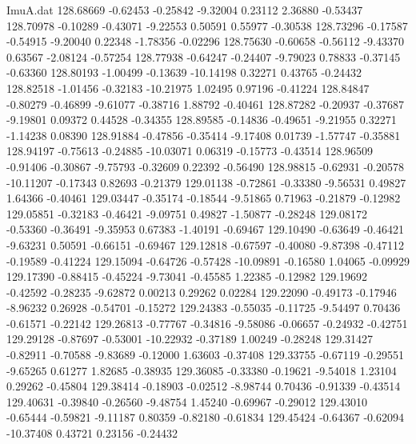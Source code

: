\begin{filecontents}{ImuA.dat}
 128.68669   -0.62453   -0.25842   -9.32004    0.23112    2.36880   -0.53437
 128.70978   -0.10289   -0.43071   -9.22553    0.50591    0.55977   -0.30538
 128.73296   -0.17587   -0.54915   -9.20040    0.22348   -1.78356   -0.02296
 128.75630   -0.60658   -0.56112   -9.43370    0.63567   -2.08124   -0.57254
 128.77938   -0.64247   -0.24407   -9.79023    0.78833   -0.37145   -0.63360
 128.80193   -1.00499   -0.13639  -10.14198    0.32271    0.43765   -0.24432
 128.82518   -1.01456   -0.32183  -10.21975    1.02495    0.97196   -0.41224
 128.84847   -0.80279   -0.46899   -9.61077   -0.38716    1.88792   -0.40461
 128.87282   -0.20937   -0.37687   -9.19801    0.09372    0.44528   -0.34355
 128.89585   -0.14836   -0.49651   -9.21955    0.32271   -1.14238    0.08390
 128.91884   -0.47856   -0.35414   -9.17408    0.01739   -1.57747   -0.35881
 128.94197   -0.75613   -0.24885  -10.03071    0.06319   -0.15773   -0.43514
 128.96509   -0.91406   -0.30867   -9.75793   -0.32609    0.22392   -0.56490
 128.98815   -0.62931   -0.20578  -10.11207   -0.17343    0.82693   -0.21379
 129.01138   -0.72861   -0.33380   -9.56531    0.49827    1.64366   -0.40461
 129.03447   -0.35174   -0.18544   -9.51865    0.71963   -0.21879   -0.12982
 129.05851   -0.32183   -0.46421   -9.09751    0.49827   -1.50877   -0.28248
 129.08172   -0.53360   -0.36491   -9.35953    0.67383   -1.40191   -0.69467
 129.10490   -0.63649   -0.46421   -9.63231    0.50591   -0.66151   -0.69467
 129.12818   -0.67597   -0.40080   -9.87398   -0.47112   -0.19589   -0.41224
 129.15094   -0.64726   -0.57428  -10.09891   -0.16580    1.04065   -0.09929
 129.17390   -0.88415   -0.45224   -9.73041   -0.45585    1.22385   -0.12982
 129.19692   -0.42592   -0.28235   -9.62872    0.00213    0.29262    0.02284
 129.22090   -0.49173   -0.17946   -8.96232    0.26928   -0.54701   -0.15272
 129.24383   -0.55035   -0.11725   -9.54497    0.70436   -0.61571   -0.22142
 129.26813   -0.77767   -0.34816   -9.58086   -0.06657   -0.24932   -0.42751
 129.29128   -0.87697   -0.53001  -10.22932   -0.37189    1.00249   -0.28248
 129.31427   -0.82911   -0.70588   -9.83689   -0.12000    1.63603   -0.37408
 129.33755   -0.67119   -0.29551   -9.65265    0.61277    1.82685   -0.38935
 129.36085   -0.33380   -0.19621   -9.54018    1.23104    0.29262   -0.45804
 129.38414   -0.18903   -0.02512   -8.98744    0.70436   -0.91339   -0.43514
 129.40631   -0.39840   -0.26560   -9.48754    1.45240   -0.69967   -0.29012
 129.43010   -0.65444   -0.59821   -9.11187    0.80359   -0.82180   -0.61834
 129.45424   -0.64367   -0.62094  -10.37408    0.43721    0.23156   -0.24432

\end{filecontents}
